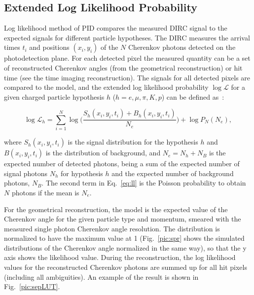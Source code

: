 \subsection{Extended Log Likelihood Probability}

Log likelihood method of PID compares the measured DIRC signal to the expected signals for different particle hypotheses. The DIRC measures the arrival times $t_{i}$ and positions $(x_{i}, y_{i})$ of the $N$ Cherenkov photons detected on the photodetection plane. For each detected pixel the measured quantity can be a set of reconstructed Cherenkov angles (from the geometrical reconstruction) or hit time (see the time imaging reconstruction). The signals for all detected pixels are compared to the model, and the extended log likelihood probability $\log\mathcal{L}$ for a given charged particle hypothesis $h$ 
($h = e, \mu, \pi, K, p$) can be 
defined as~\cite{staric2}:

\begin{equation}
\log\mathcal{L}_{h} = \sum_{i=1}^{N} \log \Big( \frac{S_{h}(x_{i}, y_{i}, t_{i}) + B_{h}(x_{i}, y_{i}, t_{i})}{N_{e}} \Big) + \log P_{N}(N_{e}),
\label{eq:ll}
\end{equation}

\noindent where $S_{h} (x_{i}, y_{i}, t_{i})$ is the signal distribution for the hypothesis $h$ and $B(x_{i}, y_{i}, t_{i})$ is the distribution of background, and $N_{e} = N_{h} + N_{B}$ is the expected number of detected photons, being a sum of the expected number of signal photons $N_{h}$ for hypothesis $h$ and the expected number of background photons, $N_{B}$. The second term in Eq.~\ref{eq:ll} is the Poisson probability to obtain $N$ photons if the mean is $N_{e}$.

For the geometrical reconstruction, the model is the expected value of the Cherenkov angle for the given particle type and momentum, smeared with the measured single photon Cherenkov angle resolution. The distribution is normalized to have the maximum value at 1 (Fig.~\ref{pic:spr} shows the simulated distributions of the Cherenkov angle normalized in the same way), so that the y axis shows the likelihood value. During the reconstruction, the log likelihood values for the reconstructed Cherenkov photons are summed up for all hit pixels (including all ambiguities). An example of the result is shown in Fig.~\ref{pic:sepLUT}.

